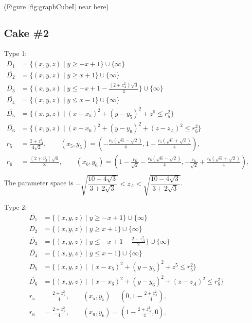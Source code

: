 \documentclass[suppldata, dvipdfmx]{interact}
\theoremstyle{plain}%
\theoremstyle{definition}
\theoremstyle{remark}
\theoremstyle{problemstyle}
\begin{document}
\noindent(Figure \ref{fig:graphCubeI} near here)


\subsection{Cake \#2}
Type 1:
\begin{align*}
\overline{D_1}&= \{ (x,y,z) \mid y \ge -x + 1 \} \cup \{ \infty \}\\
\overline{D_2}&= \{ (x,y,z) \mid y \ge x + 1 \} \cup \{ \infty \}\\
\overline{D_3}&= \{ (x,y,z) \mid y \le -x + 1 - \frac{(2 + z_A^2)\sqrt{3}}{4} \} \cup \{ \infty \}\\
\overline{D_4}&= \{ (x,y,z) \mid y \le x - 1 \} \cup \{ \infty \}\\
\overline{D_5}&=\{(x,y,z) \mid (x-x_5)^2+(y-y_5)^2+z^5 \le r_5^2 \} \\
\overline{D_6}&=\{(x,y,z) \mid (x-x_6)^2+(y-y_6)^2+(z-z_A)^2 \le r_6^2 \} \\
r_5 &= \frac{2 + z_A^2}{4\sqrt{2}}, \qquad
(x_5, y_5) = \left(-\frac{r_5(\sqrt{6} - \sqrt{2})}{4}, 1 - \frac{r_5(\sqrt{6} + \sqrt{2})}{4} \right),\\
r_6 &= \frac{(2 + z_A^2)\sqrt{6}}{8}, \qquad
(x_6, y_6) = \left( 1 - \frac{r_6}{\sqrt{2}} - \frac{r_6(\sqrt{6} - \sqrt{2})}{4}, -\frac{r_6}{\sqrt{2}} + \frac{r_6(\sqrt{6} + \sqrt{2})}{4}\right), \\
\end{align*}
The parameter space is $- \sqrt{\dfrac{10 - 4 \sqrt{3}}{3 + 2 \sqrt{3}}} < z_A <\sqrt{\dfrac{10 - 4 \sqrt{3}}{3 + 2 \sqrt{3}}}$.
\bigskip\par
Type 2:
\begin{align*}
\overline{D_1}&= \{ (x,y,z) \mid y \ge -x + 1 \} \cup \{ \infty \}\\
\overline{D_2}&= \{ (x,y,z) \mid y \ge x + 1 \} \cup \{ \infty \}\\
\overline{D_3}&= \{ (x,y,z) \mid y \le -x + 1 - \frac{2 + z_A^2}{2} \} \cup \{ \infty \}\\
\overline{D_4}&= \{ (x,y,z) \mid y \le x - 1 \} \cup \{ \infty \}\\
\overline{D_5}&=\{(x,y,z) \mid (x-x_5)^2+(y-y_5)^2+z^5 \le r_5^2 \} \\
\overline{D_6}&=\{(x,y,z) \mid (x-x_6)^2+(y-y_6)^2+(z-z_A)^2 \le r_6^2 \} \\
r_5 &= \frac{2 + z_A^2}{4}, \qquad
(x_5, y_5) = \left(0, 1 - \frac{2 + z_A^2}{4} \right), \\
r_6 &= \frac{2 + z_A^2}{4}, \qquad
(x_6, y_6) = \left(1 - \frac{2 + z_A^2}{4}, 0 \right), \\
\end{align*}
\end{document}
